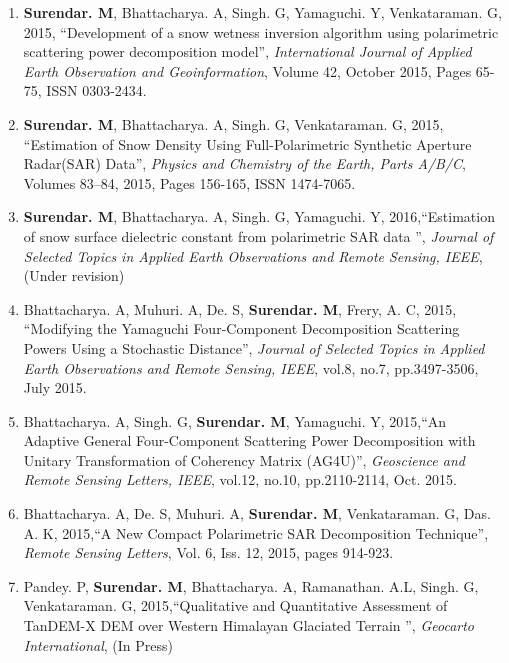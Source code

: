 \begin{enumerate}
	
\item \textbf{Surendar. M}, Bhattacharya. A, Singh. G,  Yamaguchi. Y, Venkataraman. G, 2015,	\textquotedblleft Development of a snow wetness inversion algorithm using polarimetric scattering power decomposition model\textquotedblright, \textit{International Journal of Applied Earth Observation and Geoinformation}, Volume 42, October 2015, Pages 65-75, ISSN 0303-2434.

\item \textbf{Surendar. M}, Bhattacharya. A, Singh. G, Venkataraman. G, 2015,	\textquotedblleft Estimation of Snow Density Using Full-Polarimetric Synthetic Aperture Radar(SAR) Data\textquotedblright, \textit{Physics and Chemistry of the Earth, Parts A/B/C}, Volumes 83--84, 2015, Pages 156-165, ISSN 1474-7065.
	
\item \textbf{Surendar. M}, Bhattacharya. A, Singh. G,  Yamaguchi. Y, 2016,\textquotedblleft Estimation of snow surface dielectric constant from polarimetric SAR data \textquotedblright, \textit{Journal of Selected Topics in Applied Earth Observations and Remote Sensing, IEEE}, (Under revision)
	
\item Bhattacharya. A, Muhuri. A, De. S, \textbf{Surendar. M}, Frery, A. C, 2015,	\textquotedblleft Modifying the Yamaguchi Four-Component Decomposition Scattering Powers Using a Stochastic Distance\textquotedblright, \textit{Journal of Selected Topics in Applied Earth Observations and Remote Sensing, IEEE}, vol.8, no.7, pp.3497-3506, July 2015.
	
\item Bhattacharya. A, Singh. G, \textbf{Surendar. M}, Yamaguchi. Y, 2015,\textquotedblleft An Adaptive General Four-Component Scattering Power Decomposition with Unitary Transformation of Coherency Matrix (AG4U)\textquotedblright, \textit{Geoscience and Remote Sensing Letters, IEEE}, vol.12, no.10, pp.2110-2114, Oct. 2015.

\item Bhattacharya. A, De. S, Muhuri. A, \textbf{Surendar. M}, Venkataraman. G, Das. A. K, 2015,\textquotedblleft A New Compact Polarimetric SAR Decomposition Technique\textquotedblright, \textit{Remote Sensing Letters}, Vol. 6, Iss. 12, 2015, pages 914-923.

\item Pandey. P, \textbf{Surendar. M}, Bhattacharya. A, Ramanathan. A.L, Singh. G, Venkataraman. G, 2015,\textquotedblleft Qualitative and Quantitative Assessment of TanDEM-X DEM over Western Himalayan Glaciated Terrain \textquotedblright, \textit{Geocarto International}, (In Press)

\end{enumerate}

